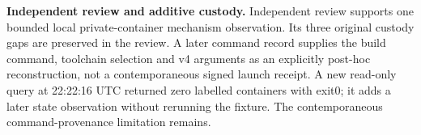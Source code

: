 \textbf{Independent review and additive custody.} Independent review supports one bounded local private-container mechanism observation. Its three original custody gaps are preserved in the review. A later command record supplies the build command, toolchain selection and v4 arguments as an explicitly post-hoc reconstruction, not a contemporaneous signed launch receipt. A new read-only query at 22:22:16 UTC returned zero labelled containers with exit0; it adds a later state observation without rerunning the fixture. The contemporaneous command-provenance limitation remains.
